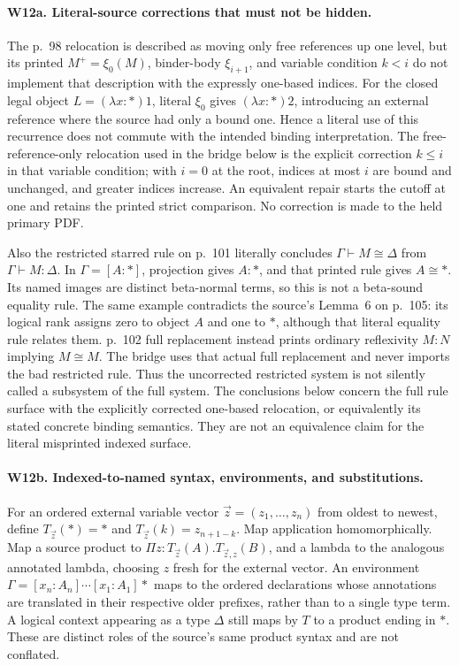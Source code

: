 \paragraph{W12a. Literal-source corrections that must not be hidden.}
The p.~98 relocation is described as moving only free references up
one level, but its printed \(M^+=\xi_0(M)\), binder-body
\(\xi_{i+1}\), and variable condition \(k<i\) do not implement
that description with the expressly one-based indices. For the closed
legal object \(L=(\lambda x:\ast)1\), literal \(\xi_0\) gives
\((\lambda x:\ast)2\), introducing an external reference where the
source had only a bound one. Hence a literal use of this recurrence
does not commute with the intended binding interpretation. The
free-reference-only relocation used in the bridge below is the
explicit correction \(k\le i\) in that variable condition; with
\(i=0\) at the root, indices at most \(i\) are bound and unchanged,
and greater indices increase. An equivalent repair starts the cutoff
at one and retains the printed strict comparison. No correction is
made to the held primary PDF.

Also the restricted starred rule on p.~101 literally concludes
\(\Gamma\vdash M\cong\Delta\) from \(\Gamma\vdash M:\Delta\).
In \(\Gamma=[A:\ast]\), projection gives \(A:\ast\), and that
printed rule gives \(A\cong\ast\). Its named images are distinct
beta-normal terms, so this is not a beta-sound equality rule. The
same example contradicts the source's Lemma~6 on p.~105: its logical
rank assigns zero to object \(A\) and one to \(\ast\), although
that literal equality rule relates them.
p.~102 full replacement instead prints ordinary reflexivity
\(M:N\) implying \(M\cong M\). The bridge uses that actual full
replacement and never imports the bad restricted rule. Thus the
uncorrected restricted system is not silently called a subsystem of
the full system. The conclusions below concern the full rule surface
with the explicitly corrected one-based relocation, or equivalently
its stated concrete binding semantics. They are not an equivalence
claim for the literal misprinted indexed surface.

\paragraph{W12b. Indexed-to-named syntax, environments, and substitutions.}
For an ordered external variable vector \(\vec z=(z_1,\ldots,z_n)\)
from oldest to newest, define \(T_{\vec z}(\ast)=\ast\) and
\(T_{\vec z}(k)=z_{n+1-k}\). Map application homomorphically.
Map a source product to \(\Pi z:T_{\vec z}(A).
T_{\vec z,z}(B)\), and a lambda to the analogous annotated lambda,
choosing \(z\) fresh for the external vector. An environment
\(\Gamma=[x_n:A_n]\cdots[x_1:A_1]\ast\) maps to the ordered
declarations whose annotations are translated in their respective
older prefixes, rather than to a single type term. A logical context
appearing as a type \(\Delta\) still maps by \(T\) to a product
ending in \(\ast\). These are distinct roles of the source's
same product syntax and are not conflated.

